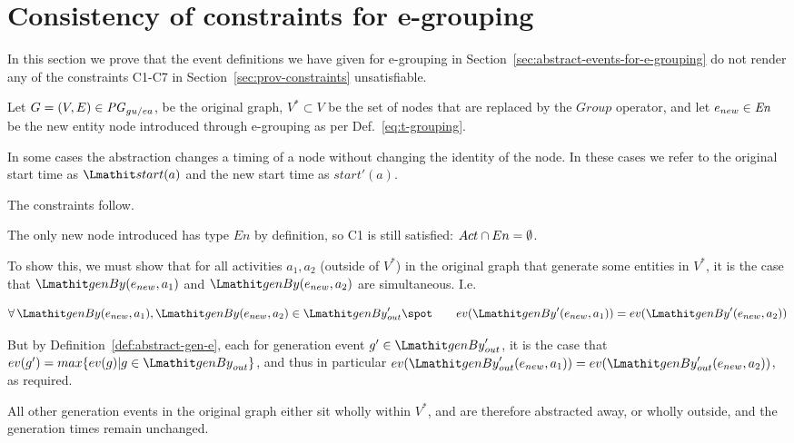 

\section{Consistency of constraints for e-grouping}
\label{sec:consistency-constraints-e-grouping}

In this section we prove that the event definitions we have given for e-grouping in Section~\ref{sec:abstract-events-for-e-grouping} do not render any of the constraints C1-C7 in Section~\ref{sec:prov-constraints} unsatisfiable.

Let $G=(V,E) \in \mathit{PG}_{gu/ea}$, be the original graph,  $V^* \subset V$ be the set of nodes that are replaced by the $Group$ operator, and let  $e_{new} \in \mathit{En}$ be the new entity node introduced through e-grouping as per Def.~\ref{eq:t-grouping}. 

In some cases the abstraction changes a timing of a node without changing the identity of the node.  In these cases we refer to the original start time as $\start(a)$ and the new start time as $start'(a)$. 

The constraints follow.



The only new node introduced has type $En$ by definition, so C1 is still satisfied: $Act \cap En = \emptyset$.


To show this, we must show that for all activities $a_1,a_2$ (outside of $V^*$)  in the original graph that generate some entities in $V^*$, it is the case that  $\wgby(e_{new},a_1)$ and $\wgby(e_{new},a_2)$ are simultaneous. I.e.

\[
\forall \wgby(e_{new},a_1), \wgby(e_{new},a_2) \in \wgby'_{out} \spot \\

\qquad ev(\wgby'(e_{new},a_1)) = ev(\wgby'(e_{new},a_2))
\]

But by Definition~\ref{def:abstract-gen-e}, each for generation event  $g' \in \wgby'_{out}$, it is the case that $ev(g') = max \{ ev(g) | g \in \wgby_{out} \}$, and thus in particular $ev(\wgby'_{out}(e_{new},a_1)) = ev(\wgby'_{out}(e_{new},a_2))$, as required.

All other generation events in the original graph either sit wholly within $V^*$, and are therefore abstracted away, or wholly outside, and the generation times remain unchanged. 


